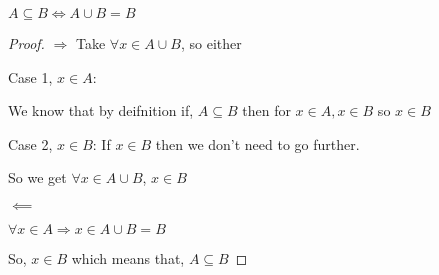 \begin{theorem}
    $A \subseteq B \iff A \cup B = B$
     \begin{proof}
        $\Rightarrow$   
        Take $\forall x \in A \cup B$, so either
        
        Case 1, $x \in A$:

        We know that by deifnition if, $A \subseteq B$ then for  $x \in A, x \in B$ so  $x \in B$
        
        Case 2, $x \in B$:
        If $x \in B$ then we don't need to go further.


        So we get $\forall x \in A \cup B$,  $x \in B$

        $\impliedby$

        $\forall x \in A \Rightarrow x \in A \cup B = B$

        So,  $x \in B$ which means that, $A \subseteq B$
        
    \end{proof}
\end{theorem}



